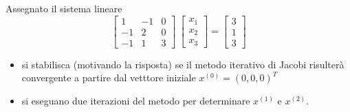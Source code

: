  Assegnato il sistema lineare
\[ \left[ \begin{array}{ccc} 1 & -1 & 0 \\ -1 & 2 & 0\\ -1 & 1&3
\end{array} \right] \ \left[ \begin{array}{c}  x_1 \\ x_2 \\
x_3 
\end{array} \right] =
\left[ \begin{array}{c}  3 \\ 1\\ 3 
\end{array} \right]
\]
\begin{itemize}
\item si stabilisca (motivando la risposta) se il metodo iterativo di
Jacobi risulter\`a convergente a partire dal vetttore iniziale
$x^{(0)}=(0,0,0)^T$
\item si eseguano due iterazioni del metodo per determinare $x^{(1)}$ e
$x^{(2)}.$
\end{itemize}